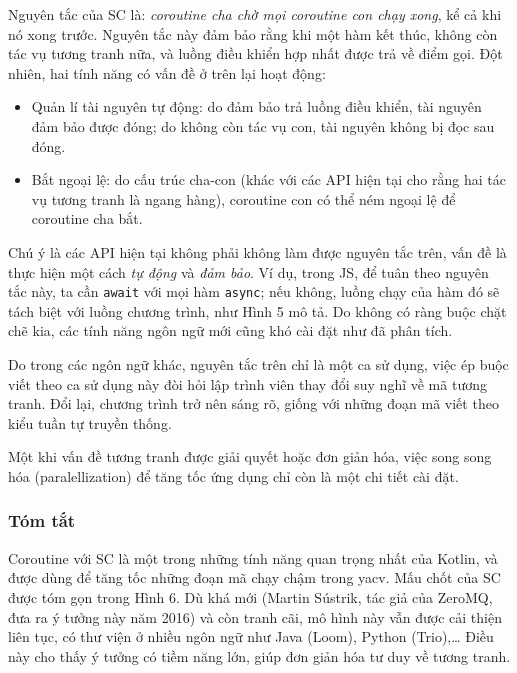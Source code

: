 \documentclass[../../thesis]{subfiles}
\begin{document}
Nguyên tắc của SC là: \emph{coroutine cha chờ mọi coroutine con chạy xong}, kể
cả khi nó xong trước. Nguyên tắc này đảm bảo rằng khi một hàm kết thúc, không
còn tác vụ tương tranh nữa, và luồng điều khiển hợp nhất được trả về điểm gọi.
Đột nhiên, hai tính năng có vấn đề ở trên lại hoạt động:

\begin{itemize}
    \item
        Quản lí tài nguyên tự động: do đảm bảo trả luồng điều khiển, tài nguyên
        đảm bảo được đóng; do không còn tác vụ con, tài nguyên không bị đọc sau
        đóng.
\end{itemize}

\begin{itemize}[resume, before = \vspace*{-\dimexpr\topsep+\partopsep\relax}]
    \item
        Bắt ngoại lệ: do cấu trúc cha-con (khác với các API hiện tại cho rằng
        hai tác vụ tương tranh là ngang hàng), coroutine con có thể ném ngoại lệ
        để coroutine cha bắt.
\end{itemize}

Chú ý là các API hiện tại không phải không làm được nguyên tắc trên, vấn đề là
thực hiện một cách \emph{tự động} và \emph{đảm bảo}. Ví dụ, trong JS, để tuân
theo nguyên tắc này, ta cần \texttt{await} với mọi hàm \texttt{async}; nếu
không, luồng chạy của hàm đó sẽ tách biệt với luồng chương trình, như Hình 5 mô
tả. Do không có ràng buộc chặt chẽ kia, các tính năng ngôn ngữ mới cũng khó cài
đặt như đã phân tích.

Do trong các ngôn ngữ khác, nguyên tắc trên chỉ là một ca sử dụng, việc ép buộc
viết theo ca sử dụng này đòi hỏi lập trình viên thay đổi suy nghĩ về mã tương
tranh. Đổi lại, chương trình trở nên sáng rõ, giống với những đoạn mã viết theo
kiểu tuần tự truyền thống.

Một khi vấn đề tương tranh được giải quyết hoặc đơn giản hóa, việc song song hóa
(paralellization) để tăng tốc ứng dụng chỉ còn là một chi tiết cài đặt.

\subsubsection{Tóm tắt}

Coroutine với SC là một trong những tính năng quan trọng nhất của Kotlin, và
được dùng để tăng tốc những đoạn mã chạy chậm trong yacv. Mấu chốt của SC được
tóm gọn trong Hình 6. Dù khá mới (Martin Sústrik, tác giả của ZeroMQ, đưa ra ý
tưởng này năm 2016) và còn tranh cãi, mô hình này vẫn được cải thiện liên tục,
có thư viện ở nhiều ngôn ngữ như Java (Loom), Python (Trio),\ldots{} Điều này
cho thấy ý tưởng có tiềm năng lớn, giúp đơn giản hóa tư duy về tương tranh.
\end{document}

